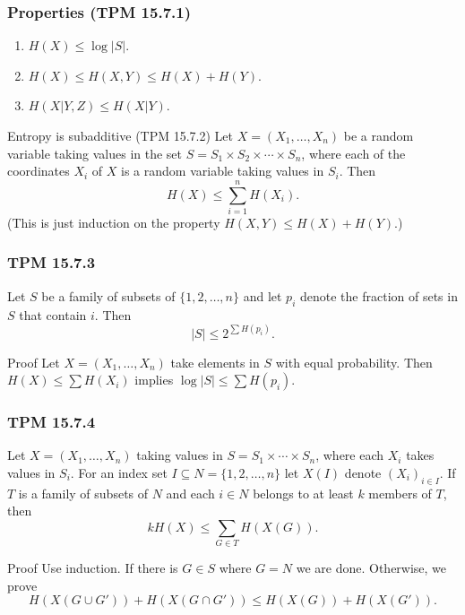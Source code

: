 \documentclass{beamer}
\begin{document}
\begin{frame}
  \frametitle{Properties (TPM 15.7.1)}
  \begin{enumerate}
    \item $H(X) \le \log |S|$. \pause
    \item $H(X) \le H(X, Y) \le H(X) + H(Y)$. \pause
    \item $H(X|Y, Z) \le H(X|Y)$. \pause
  \end{enumerate}

  \begin{block}{Entropy is subadditive (TPM 15.7.2)}
    Let $X = (X_1, \dotsc, X_n)$ be a random variable taking values in the set $S = S_1 \times S_2 \times \dotsb \times S_n$, where each of the coordinates $X_i$ of $X$ is a random variable taking values in $S_i$. Then \[ H(X) \le \sum_{i = 1}^n H(X_i). \] \pause (This is just induction on the property $H(X, Y) \le H(X) + H(Y)$.)
  \end{block}
\end{frame}

\begin{frame}
  \frametitle{TPM 15.7.3}
  Let $S$ be a family of subsets of $\{ 1, 2, \dotsc, n \}$ and let $p_i$ denote the fraction of sets in $S$ that contain $i$. Then \[ |S| \le 2^{\sum H(p_i)}. \] \pause

  \begin{block}{Proof}
    Let $X = (X_1, \dotsc, X_n)$ take elements in $S$ with equal probability. Then $H(X) \le \sum H(X_i)$ implies $\log |S| \le \sum H(p_i)$.
  \end{block}
\end{frame}

\begin{frame}
  \frametitle{TPM 15.7.4}
  Let $X = (X_1, \dotsc, X_n)$ taking values in $S = S_1 \times \dotsb \times S_n$, where each $X_i$ takes values in $S_i$. For an index set $I \subseteq N = \{ 1, 2, \dotsc, n \}$ let $X(I)$ denote $(X_i)_{i \in I}$. If $T$ is a family of subsets of $N$ and each $i \in N$ belongs to at least $k$ members of $T$, then \[ kH(X) \le \sum_{G \in T} H(X(G)). \] \pause

  \begin{block}{Proof}
    Use induction. If there is $G \in S$ where $G = N$ we are done. Otherwise, we prove \[ H(X(G \cup G')) + H(X(G \cap G')) \le H(X(G)) + H(X(G')). \]
  \end{block}
\end{frame}
\end{document}
